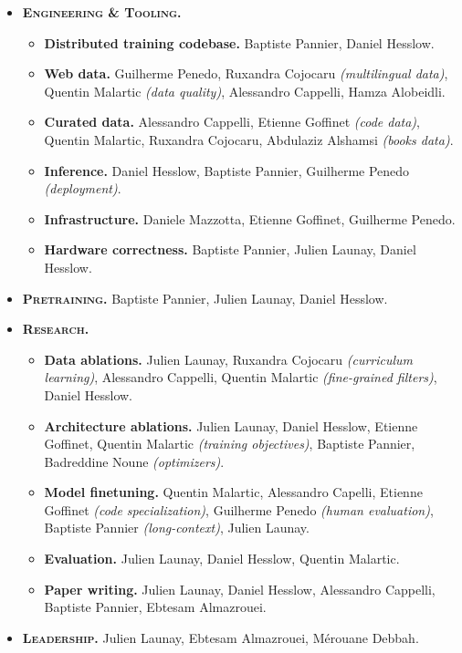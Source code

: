 \documentclass{article}
\begin{document}
\begin{itemize}
    \item \textbf{\textsc{Engineering \& Tooling.}} 
    \begin{itemize}
        \item \textbf{Distributed training codebase.} Baptiste Pannier, Daniel Hesslow. 
        \item \textbf{Web data.} Guilherme Penedo, Ruxandra Cojocaru \emph{(multilingual data)}, Quentin Malartic \emph{(data quality)}, Alessandro Cappelli, Hamza Alobeidli. 
        \item \textbf{Curated data.} Alessandro Cappelli, Etienne Goffinet \emph{(code data)}, Quentin Malartic, Ruxandra Cojocaru, Abdulaziz Alshamsi \emph{(books data)}.
        \item \textbf{Inference.} Daniel Hesslow, Baptiste Pannier, Guilherme Penedo \emph{(deployment)}.
        \item \textbf{Infrastructure.} Daniele Mazzotta, Etienne Goffinet, Guilherme Penedo.
        \item \textbf{Hardware correctness.} Baptiste Pannier, Julien Launay, Daniel Hesslow.
    \end{itemize}
    \item  \textbf{\textsc{Pretraining.}}  Baptiste Pannier, Julien Launay, Daniel Hesslow.
    \item \textbf{\textsc{Research.}} 
    \begin{itemize}
    \item \textbf{Data ablations.} Julien Launay, Ruxandra Cojocaru \emph{(curriculum learning)}, Alessandro Cappelli, Quentin Malartic \emph{(fine-grained filters)}, Daniel Hesslow.
    \item \textbf{Architecture ablations.} Julien Launay, Daniel Hesslow, Etienne Goffinet, Quentin Malartic \emph{(training objectives)}, Baptiste Pannier, Badreddine Noune \emph{(optimizers)}.
     \item \textbf{Model finetuning.} Quentin Malartic, Alessandro Capelli, Etienne Goffinet \emph{(code specialization)}, Guilherme Penedo \emph{(human evaluation)}, Baptiste Pannier \emph{(long-context)}, Julien Launay.
     \item \textbf{Evaluation.} Julien Launay, Daniel Hesslow, Quentin Malartic.
     \item \textbf{Paper writing.} Julien Launay, Daniel Hesslow, Alessandro Cappelli, Baptiste Pannier, Ebtesam Almazrouei.
    \end{itemize}
     \item \textbf{\textsc{Leadership.}}  Julien Launay, Ebtesam Almazrouei, Mérouane Debbah.
\end{itemize}
\end{document}
